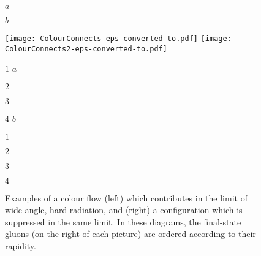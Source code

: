   \begin{figure}
  \hspace{2cm}
  \begin{minipage}[b]{0.5cm}
    \begin{flushright}
      $a$

      \vspace{3.3cm}
      $b$

      \vspace{0.3cm}
    \end{flushright}
  \end{minipage}
  \texttt{[image: ColourConnects-eps-converted-to.pdf]}
  \hspace{2.5cm}
  \texttt{[image: ColourConnects2-eps-converted-to.pdf]}
  \hspace{-6.cm} 
  \begin{minipage}[b]{4cm}
    $1$ \hspace{2cm} $a$

    \vspace{0.8cm}
    $2$

    \vspace{0.7cm}
    $3$

    \vspace{0.7cm}
    $4$ \hspace{2cm} $b$

    \vspace{0.3cm}
  \end{minipage}
  \hspace{1.6cm}
  \begin{minipage}[b]{0.5cm}
    $1$

    \vspace{0.7cm}
    $2$

    \vspace{0.7cm}
    $3$

    \vspace{0.8cm}
    $4$

    \vspace{0.3cm}
  \end{minipage}
  \caption{Examples of a colour flow (left) which contributes in the
    limit of wide angle, hard radiation, and (right) a configuration which
    is suppressed in the same limit. In these diagrams, the final-state
    gluons (on the right of each picture) are ordered according to their
    rapidity.}
  \label{fig:Colours}
\end{figure}

